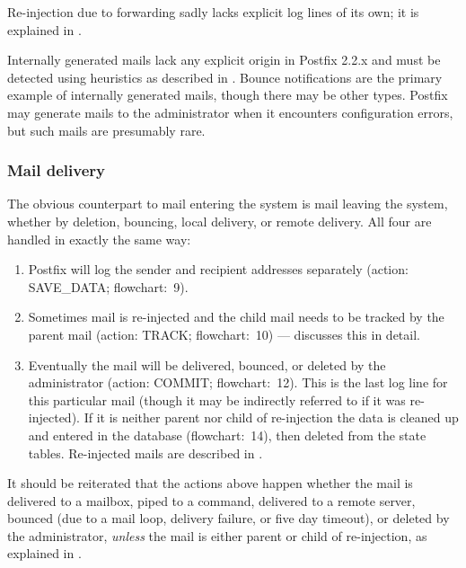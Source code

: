Re-injection due to forwarding sadly lacks explicit log lines of its
own; it is explained in .

Internally generated mails lack any explicit origin in Postfix 2.2.x and
must be detected using heuristics as described in
.  Bounce notifications are
the primary example of internally generated mails, though there may be
other types.  Postfix may generate mails to the administrator when it
encounters configuration errors, but such mails are presumably rare.

\subsubsection{Mail delivery}

\label{mail-delivery}

The obvious counterpart to mail entering the system is mail leaving the
system, whether by deletion, bouncing, local delivery, or remote delivery.
All four are handled in exactly the same way:

\begin{enumerate}

    \item Postfix will log the sender and recipient addresses separately
        (action: SAVE\_DATA\@; flowchart:~9).

    \item Sometimes mail is re-injected and the child mail needs to be
        tracked by the parent mail (action: TRACK\@; flowchart:~10) ---
         discusses this in
        detail.

    \item Eventually the mail will be delivered, bounced, or deleted by the
        administrator (action: COMMIT\@; flowchart:~12).  This is the last
        log line for this particular mail (though it may be indirectly
        referred to if it was re-injected).  If it is neither parent nor
        child of re-injection the data is cleaned up and entered in the
        database (flowchart:~14), then deleted from the state tables.
        Re-injected mails are described in .

\end{enumerate}

It should be reiterated that the actions above happen whether the mail is
delivered to a mailbox, piped to a command, delivered to a remote server,
bounced (due to a mail loop, delivery failure, or five day timeout), or
deleted by the administrator, \textit{unless\/} the mail is either parent
or child of re-injection, as explained in .

